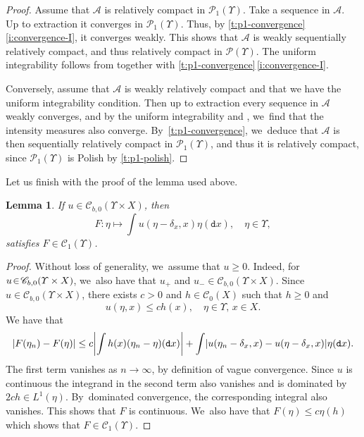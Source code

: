 \documentclass[10pt]{amsart}
\newtheorem{lemma}[theorem]{Lemma}
\theoremstyle{definition}
\theoremstyle{remark}
\DeclarePairedDelimiter{\abs}{\lvert}{\rvert}
\begin{document}
\begin{proof}
Assume that $\mathscr{A}$ is relatively compact in $\mathscr{P}_{1}(\varUpsilon)$.
Take a sequence in $\mathscr{A}$.
Up to extraction it converges in $\mathscr{P}_{1}(\varUpsilon)$.
Thus, by \cref{t:p1-convergence}\,\cref{i:convergence-I}, it converges weakly.
This shows that $\mathscr{A}$ is weakly sequentially relatively compact, and thus relatively compact in $\mathscr{P}(\varUpsilon)$.
The uniform integrability follows from \cite[Lem.\,5.11]{KallenbergFMP} together with \cref{t:p1-convergence}\,\cref{i:convergence-I}.

Conversely, assume that $\mathscr{A}$ is weakly relatively compact and that we have the uniform integrability condition.
Then up to extraction every sequence in $\mathscr{A}$ weakly converges, and by the uniform integrability and \cite[Lem.\,5.11]{KallenbergFMP}, we~find that the intensity measures also converge.
By~\cref{t:p1-convergence}, we~deduce that $\mathscr{A}$ is then sequentially relatively compact in $\mathscr{P}_{1}(\varUpsilon)$, and thus it is relatively compact, since $\mathscr{P}_{1}(\varUpsilon)$ is Polish by \cref{t:p1-polish}.
\end{proof}

Let us finish with the proof of the lemma used above.
\begin{lemma}\label{t:f-from-u-continuous}
If $u \in \mathscr{C}_{b,0}(\varUpsilon \times X)$, then
\begin{equation*}
F \colon \eta \longmapsto \int u(\eta - \delta_{x}, x) \eta(\mathtt{d} x), \quad \eta \in \varUpsilon,
\end{equation*}
satisfies $F \in \mathscr{C}_{1}(\varUpsilon)$.
\end{lemma}
\begin{proof}
Without loss of generality, we~assume that $u \!\geq\! 0$.
Indeed, for $u \!\in\! \mathscr{C}_{b,0}(\varUpsilon \times\nobreak X)$, we~also have that $u_{+}$ and $u_{-} \in \mathscr{C}_{b,0}(\varUpsilon \times X)$.
Since $u \in \mathscr{C}_{b,0}(\varUpsilon \times X)$, there exists $c > 0$ and $h \in \mathscr{C}_{0}(X)$ such that $h \geq 0$ and
\begin{equation*}
u(\eta, x) \leq c h(x), \quad \eta \in \varUpsilon,\, x \in X.
\end{equation*}
We have that
\begin{equation*}
\abs{F(\eta_{n}) - F(\eta)} \leq c \abs*{ \int h(x) (\eta_{n} - \eta)(\mathtt{d} x) } + \int \abs*{ u(\eta_{n} - \delta_{x}, x) - u(\eta - \delta_{x}, x) } \eta(\mathtt{d} x).
\end{equation*}
The first term vanishes as $n \to \infty$, by definition of vague convergence.
Since $u$ is continuous the integrand in the second term also vanishes and is dominated by $2c h \in L^{1}(\eta)$.
By~dominated convergence, the corresponding integral also vanishes.
This shows that $F$ is continuous. We~also have that $F(\eta) \leq c \eta(h)$ which shows that $F \in \mathscr{C}_{1}(\varUpsilon)$.
\end{proof}
\end{document}
